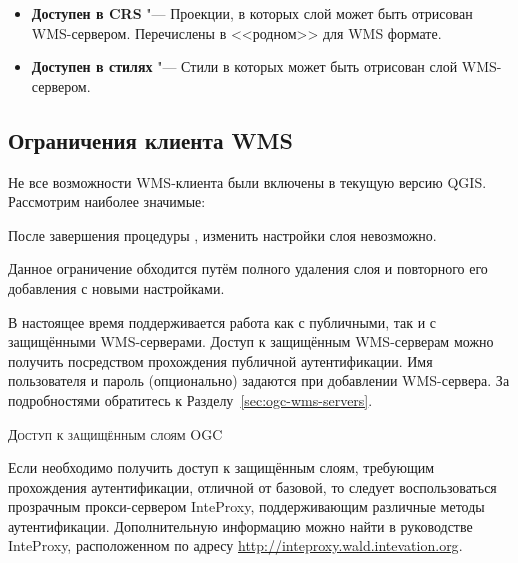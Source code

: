 \begin{itemize}[label=--]
\begin{itemize}[label=--]
\item \textbf{Доступен в CRS}      "--- Проекции, в которых слой может быть отрисован
                                       WMS-сервером. Перечислены в <<родном>>
                                       для WMS формате.

\item \textbf{Доступен в стилях}   "--- Стили в которых может быть отрисован слой
                                       WMS-сервером.

\end{itemize}

\end{itemize}


\subsection{Ограничения клиента WMS}\label{sec:ogc-wms-limits}

Не все возможности WMS-клиента были включены в текущую версию
QGIS. Рассмотрим наиболее значимые:


После завершения процедуры ,
изменить настройки слоя невозможно.

Данное ограничение обходится путём полного удаления слоя и повторного
его добавления с новыми настройками.


В настоящее время поддерживается работа как с публичными, так и с защищёнными
WMS-серверами. Доступ к защищённым WMS-серверам можно получить посредством
прохождения публичной аутентификации.
Имя пользователя и пароль (опционально) задаются при добавлении WMS-сервера.
За подробностями обратитесь к Разделу~\ref{sec:ogc-wms-servers}.

\begin{Tip}[ht]\caption{\textsc{Доступ к защищённым слоям OGC}}
Если необходимо получить доступ к защищённым слоям, требующим прохождения
аутентификации, отличной от базовой, то следует воспользоваться прозрачным
прокси-сервером InteProxy, поддерживающим различные методы
аутентификации. Дополнительную информацию можно найти в руководстве
InteProxy, расположенном по адресу
\url{http://inteproxy.wald.intevation.org}.
\end{Tip}


